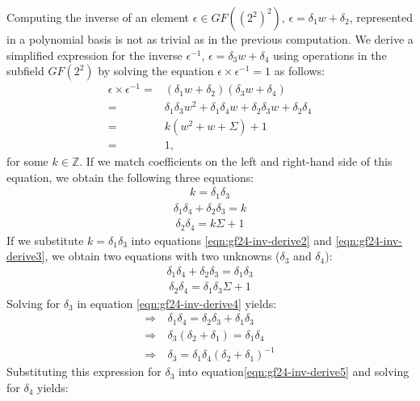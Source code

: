 Computing the inverse of an element $\epsilon \in GF((2^2)^2)$, $\epsilon = \delta_1 w + \delta_2$, represented in a polynomial basis is not as trivial as in the previous computation. We derive a simplified expression for the inverse $\epsilon^{-1}$, $\epsilon = \delta_3 w + \delta_4$ using operations in the subfield $GF(2^2)$ by solving the equation $\epsilon\times\epsilon^{-1} = 1$ as follows:
\begin{align*}
\epsilon\times\epsilon^{-1} = & (\delta_1 w + \delta_2)(\delta_3 w + \delta_4) \\
= & \delta_1\delta_3 w^2 + \delta_1\delta_4 w + \delta_2\delta_3 w + \delta_2\delta_4 \\
= & k(w^2 + w + \Sigma) + 1 \\
= & 1,
\end{align*}
for some $k \in \mathbb{Z}$. If we match coefficients on the left and right-hand side of this equation, we obtain the following three equations:
\begin{align} \label{eqn:gf24-inv-derive1}
k = \delta_1\delta_3
\end{align}
\begin{align} \label{eqn:gf24-inv-derive2}
\delta_1\delta_4 + \delta_2\delta_3 = k
\end{align}
\begin{align} \label{eqn:gf24-inv-derive3}
\delta_2\delta_4 = k\Sigma + 1
\end{align}
If we substitute $k = \delta_1\delta_3$ into equations \ref{eqn:gf24-inv-derive2} and \ref{eqn:gf24-inv-derive3}, we obtain two equations with two unknowns ($\delta_3$ and $\delta_4$):
\begin{align} \label{eqn:gf24-inv-derive4}
\delta_1\delta_4 + \delta_2\delta_3 = \delta_1\delta_3 
\end{align}
\begin{align} \label{eqn:gf24-inv-derive5}
\delta_2\delta_4 = \delta_1\delta_3\Sigma + 1
\end{align}
Solving for $\delta_3$ in equation \ref{eqn:gf24-inv-derive4} yields:
\begin{align*}
\Rightarrow \: & \delta_1\delta_4 = \delta_2\delta_3 + \delta_1\delta_3 \\
\Rightarrow \: & \delta_3(\delta_2 + \delta_1) = \delta_1\delta_4 \\
\Rightarrow \: & \delta_3 = \delta_1\delta_4(\delta_2 + \delta_1)^{-1}
\end{align*}
Substituting this expression for $\delta_3$ into equation\ref{eqn:gf24-inv-derive5} and solving for $\delta_4$ yields:
